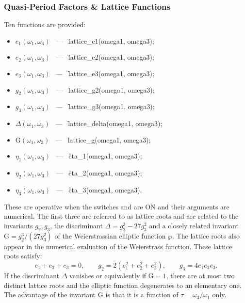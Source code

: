 \subsubsection{ Quasi-Period Factors \& Lattice Functions}
\hypertarget{ETA}{}

Ten functions are provided:
\begin{itemize}
\item $e_1(\omega_1, \omega_3)$ \ --- \ \f{lattice\_e1(omega1, omega3)};
\item $e_2(\omega_1, \omega_3)$ \ --- \ \f{lattice\_e2(omega1, omega3)};
\item $e_3(\omega_1, \omega_3)$ \ --- \ \f{lattice\_e3(omega1, omega3)};
\item $g_2(\omega_1, \omega_3)$ \ --- \ \f{lattice\_g2(omega1, omega3)};
\item $g_3(\omega_1, \omega_3)$ \ --- \ \f{lattice\_g3(omega1, omega3)};
\item $\Delta(\omega_1, \omega_3)$ \ --- \ \f{lattice\_delta(omega1, omega3)};
\item $\mathrm{G}(\omega_1, \omega_3)$ \ --- \ \f{lattice\_g(omega1, omega3)};
\item $\eta_1(\omega_1, \omega_3)$ \ --- \ \f{eta\_1(omega1, omega3)};
\item $\eta_2(\omega_1, \omega_3)$ \ --- \ \f{eta\_2(omega1, omega3)};
\item $\eta_3(\omega_1, \omega_3)$ \ --- \ \f{eta\_3(omega1, omega3)}.
\end{itemize}

These are operative when the switches  and  are ON
and their arguments are numerical. The first three are referred to as lattice
roots and are related to the invariants
$g_2, g_3$, the discriminant $\Delta = g_2^3-27g_3^2$ and a closely related
invariant $\mathrm{G} = g_2^3/(27 g_3^2)$ of the Weierstrassian
elliptic function $\wp$. The lattice roots also appear in the numerical
evaluation of the Weierstrass function. These lattice roots satisfy:
\[e_1+e_2+e_3=0,\qquad g_2=2(e_1^2+e_2^2+e_3^2),\qquad g_3= 4e_1e_2e_3.\]
If the discriminant $\Delta$ vanishes or equivalently if $\mathrm{G} = 1$,
there are at most two distinct lattice roots and the elliptic function
degenerates to an elementary one. The advantage of the invariant
$\mathrm{G}$ is that it is a function of $\tau = \omega_3/\omega_1$ only.

